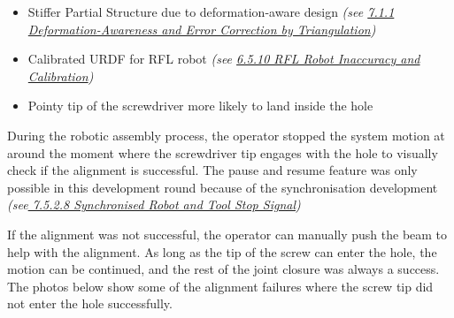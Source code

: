 \documentclass[11pt]{book}
\begin{document}
\begin{itemize}
	\item Stiffer Partial Structure due to deformation-aware design \textit{(see \uline{7.1.1 Deformation-Awareness and Error Correction by Triangulation})}

	\item Calibrated URDF for RFL robot \textit{(see \uline{6.5.10 RFL Robot Inaccuracy and Calibration})}

	\item Pointy tip of the screwdriver more likely to land inside the hole

\end{itemize}
During the robotic assembly process, the operator stopped the system motion at around the moment where the screwdriver tip engages with the hole to visually check if the alignment is successful. The pause and resume feature was only possible in this development round because of the synchronisation development \textit{(see\uline{ 7.5.2.8 Synchronised Robot and Tool Stop Signal})}

If the alignment was not successful, the operator can manually push the beam to help with the alignment. As long as the tip of the screw can enter the hole, the motion can be continued, and the rest of the joint closure was always a success. The photos below show some of the alignment failures where the screw tip did not enter the hole successfully. 
\end{document}
